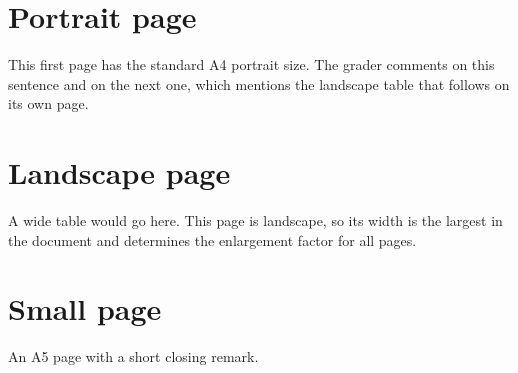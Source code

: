 \documentclass[11pt]{article}
\begin{document}
\section*{Portrait page}
This first page has the standard A4 portrait size. The grader comments on this sentence and on
the next one, which mentions the landscape table that follows on its own page.
\newpage
\pdfpagewidth=297mm \pdfpageheight=210mm
\section*{Landscape page}
A wide table would go here. This page is landscape, so its width is the largest in the document
and determines the enlargement factor for all pages.
\newpage
\pdfpagewidth=148mm \pdfpageheight=210mm
\section*{Small page}
An A5 page with a short closing remark.
\end{document}
